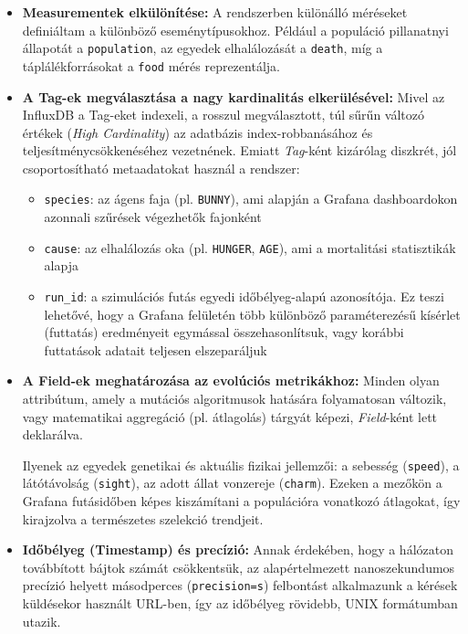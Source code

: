 \begin{itemize}
    \item \textbf{Measurementek elkülönítése:} A rendszerben különálló méréseket definiáltam a különböző eseménytípusokhoz. Például a populáció pillanatnyi állapotát a \texttt{population}, az egyedek elhalálozását a \texttt{death}, míg a táplálékforrásokat a \texttt{food} mérés reprezentálja.
    
    \item \textbf{A Tag-ek megválasztása a nagy kardinalitás elkerülésével:} Mivel az InfluxDB a Tag-eket indexeli, a rosszul megválasztott, túl sűrűn változó értékek (\textit{High Cardinality}) az adatbázis index-robbanásához és teljesítménycsökkenéséhez vezetnének. Emiatt \textit{Tag}-ként kizárólag diszkrét, jól csoportosítható metaadatokat használ a rendszer:
    \begin{itemize}
        \item \texttt{species}: az ágens faja (pl. \texttt{BUNNY}), ami alapján a Grafana dashboardokon azonnali szűrések végezhetők fajonként
        \item \texttt{cause}: az elhalálozás oka (pl. \texttt{HUNGER}, \texttt{AGE}), ami a mortalitási statisztikák alapja
        \item \texttt{run\_id}: a szimulációs futás egyedi időbélyeg-alapú azonosítója. Ez teszi lehetővé, hogy a Grafana felületén több különböző paraméterezésű kísérlet (futtatás) eredményeit egymással összehasonlítsuk, vagy korábbi futtatások adatait teljesen elszeparáljuk
    \end{itemize}

    \item \textbf{A Field-ek meghatározása az evolúciós metrikákhoz:} Minden olyan attribútum, amely a mutációs algoritmusok hatására folyamatosan változik, vagy matematikai aggregáció (pl. átlagolás) tárgyát képezi, \textit{Field}-ként lett deklarálva.

    Ilyenek az egyedek genetikai és aktuális fizikai jellemzői: a sebesség (\texttt{speed}), a látótávolság (\texttt{sight}), az adott állat vonzereje (\texttt{charm}). Ezeken a mezőkön a Grafana futásidőben képes kiszámítani a populációra vonatkozó átlagokat, így kirajzolva a természetes szelekció trendjeit.

    \item \textbf{Időbélyeg (Timestamp) és precízió:} Annak érdekében, hogy a hálózaton továbbított bájtok számát csökkentsük, az alapértelmezett nanoszekundumos precízió helyett másodperces (\texttt{precision=s}) felbontást alkalmazunk a kérések küldésekor használt URL-ben, így az időbélyeg rövidebb, UNIX formátumban utazik.
\end{itemize}

